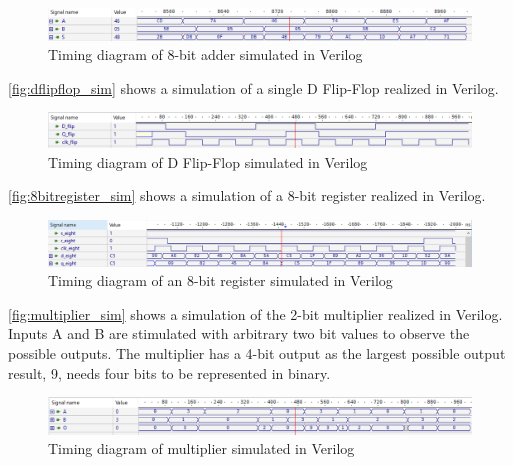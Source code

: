 \begin{figure}[H]
    \centering
    \includegraphics[width=\textwidth]{Figures/Test of eightbitadder.png}
    \caption{Timing diagram of 8-bit adder simulated in Verilog}
    \label{fig:eightbitadder_sim}
\end{figure}

\autoref{fig:dflipflop_sim} shows a simulation of a single D Flip-Flop realized in Verilog.

\begin{figure}[H]
    \centering
    \includegraphics[width=\textwidth]{Figures/Test of Dflipflop.png}
    \caption{Timing diagram of D Flip-Flop simulated in Verilog}
    \label{fig:dflipflop_sim}
\end{figure}

\autoref{fig:8bitregister_sim} shows a simulation of a 8-bit register realized in Verilog.

\begin{figure}[H]
    \centering
    \includegraphics[width=\textwidth]{Figures/VerilogPlot_8bitreg.png}
    \caption{Timing diagram of an 8-bit register simulated in Verilog}
    \label{fig:8bitregister_sim}
\end{figure}

\autoref{fig:multiplier_sim} shows a simulation of the 2-bit multiplier realized in Verilog. Inputs A and B are stimulated with arbitrary two bit values to observe the possible outputs. The multiplier has a 4-bit output as the largest possible output result, 9, needs four bits to be represented in binary.

\begin{figure}[H]
    \centering
    \includegraphics[width=\textwidth]{Figures/Test of multiplier.png}
    \caption{Timing diagram of multiplier simulated in Verilog}
    \label{fig:multiplier_sim}
\end{figure}



